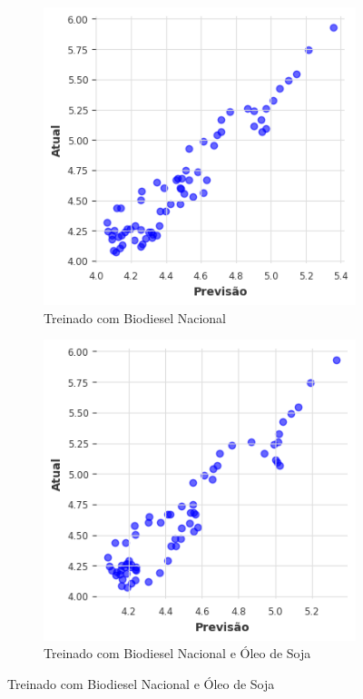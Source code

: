 \begin{figure}[htbp]
	\centering
	\begin{subfigure}[b]{0.40\textwidth}
		\centering
		\includegraphics[width=\textwidth]{figuras/darnn_brasil_scatter.png} %
		\caption{Treinado com Biodiesel Nacional \newline}
		\label{fig:darnn_brasil_scatter}
	\end{subfigure}
	\hfill
	\begin{subfigure}[b]{0.40\textwidth}
		\centering
		\includegraphics[width=\textwidth]{figuras/darnn_brasil_oil_scatter.png} %
		\caption{Treinado com Biodiesel Nacional e Óleo de Soja}
		\label{fig:darnn_brasil_oil_scatter}
	\end{subfigure}


\end{figure}
